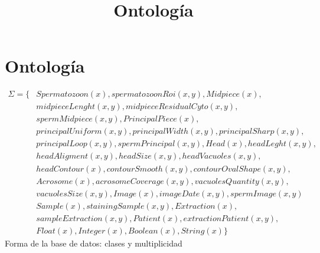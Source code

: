 \documentclass{article}
\title{Ontología}
\begin{document}
\maketitle


\begin{abstract}

\end{abstract}

\section{Ontología}
\begin{align*}
\Sigma = \{&Spermatozoon(x), spermatozoonRoi(x,y), Midpiece(x), \\
&midpieceLenght(x,y), midpieceResidualCyto(x,y), \\
&spermMidpiece(x,y), PrincipalPiece(x), \\
&principalUniform(x,y), principalWidth(x,y), principalSharp(x,y), \\
&principalLoop(x,y), spermPrincipal(x,y), Head(x), headLeght(x,y), \\
&headAligment(x,y), headSize(x,y), headVacuoles(x,y), \\
&headContour(x), contourSmooth(x,y), contourOvalShape(x,y), \\		
&Acrosome(x),acrosomeCoverage(x,y), vacuolesQuantity(x,y), \\
&vacuolesSize(x,y), Image(x), imageDate(x,y), spermImage(x,y) \\
&Sample(x), stainingSample(x,y), Extraction(x), \\
&sampleExtraction(x,y), Patient(x), extractionPatient(x,y),\\
&Float(x),Integer(x),Boolean(x), String(x)\}
\end{align*}
Forma de la base de datos: clases y multiplicidad
\end{document}
